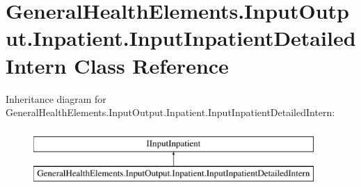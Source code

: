 \hypertarget{class_general_health_elements_1_1_input_output_1_1_inpatient_1_1_input_inpatient_detailed_intern}{}\section{General\+Health\+Elements.\+Input\+Output.\+Inpatient.\+Input\+Inpatient\+Detailed\+Intern Class Reference}
\label{class_general_health_elements_1_1_input_output_1_1_inpatient_1_1_input_inpatient_detailed_intern}
Inheritance diagram for General\+Health\+Elements.\+Input\+Output.\+Inpatient.\+Input\+Inpatient\+Detailed\+Intern\+:\begin{figure}[H]
\begin{center}
\leavevmode
\includegraphics[height=2.000000cm]{class_general_health_elements_1_1_input_output_1_1_inpatient_1_1_input_inpatient_detailed_intern}
\end{center}
\end{figure}
